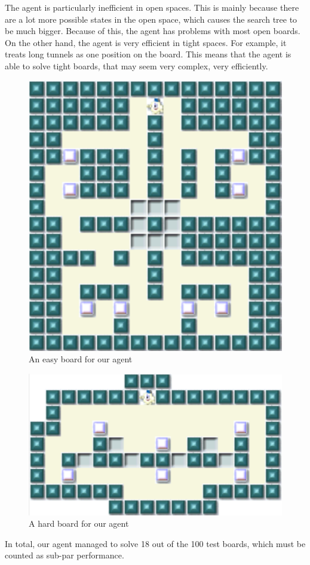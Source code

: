 \documentclass[article,11pt]{article}
\begin{document}
The agent is particularly inefficient in open spaces. This is mainly
because there are a lot more possible states in the open space, which
causes the search tree to be much bigger. Because of this, the agent
has problems with most open boards. On the other hand, the agent is
very efficient in tight spaces. For example, it treats long tunnels as
one position on the board. This means that the agent is able to solve
tight boards, that may seem very complex, very efficiently.
\begin{figure}[h]
\includegraphics[scale=0.4]{res.pdf}
\caption{An easy board for our agent}
\end{figure}

\begin{figure}[h]
\includegraphics[scale=0.4]{res2.pdf}
\caption{A hard board for our agent}
\end{figure}
In total, our agent managed to solve 18 out of the 100 test boards,
which must be counted as sub-par performance. 
\end{document}
